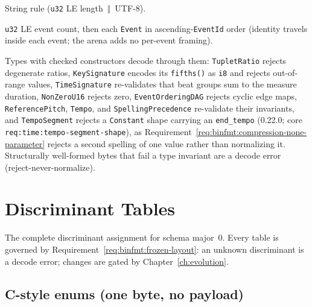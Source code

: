 \documentclass[11pt,letterpaper]{report}
\newcommand{\cat}{\ensuremath{\,\Vert\,}}
\begin{document}
\begin{description}
    String rule (\texttt{u32} LE length \cat{} UTF-8).
  \item[\texttt{EventArena}.] \texttt{u32} LE event count, then each
    \texttt{Event} in ascending-\texttt{EventId} order (identity travels
    inside each event; the arena adds no per-event framing).
  \item[Validated reconstruction.] Types with checked constructors decode
    through them: \texttt{TupletRatio} rejects degenerate ratios,
    \texttt{KeySignature} encodes its \texttt{fifths()} as \texttt{i8} and
    rejects out-of-range values, \texttt{TimeSignature} re-validates that
    beat groups sum to the measure duration, \texttt{NonZeroU16} rejects
    zero, \texttt{EventOrderingDAG} rejects cyclic edge maps,
    \texttt{ReferencePitch}, \texttt{Tempo}, and
    \texttt{SpellingPrecedence} re-validate their invariants, and
    \texttt{TempoSegment} rejects a \texttt{Constant} shape carrying an
    \texttt{end\_tempo} (0.22.0; core \texttt{req:time:tempo-segment-shape}),
    as Requirement~\ref{req:binfmt:compression-none-parameter} rejects a
    second spelling of one value rather than normalizing it. Structurally
    well-formed bytes that fail a type invariant are a decode error
    (reject-never-normalize).
\end{description}

\section{Discriminant Tables}
\label{sec:values:discriminants}

The complete discriminant assignment for schema major~0. Every table is
governed by Requirement~\ref{req:binfmt:frozen-layout}: an unknown
discriminant is a decode error; changes are gated by
Chapter~\ref{ch:evolution}.

\subsection{C-style enums (one byte, no payload)}
\end{document}
